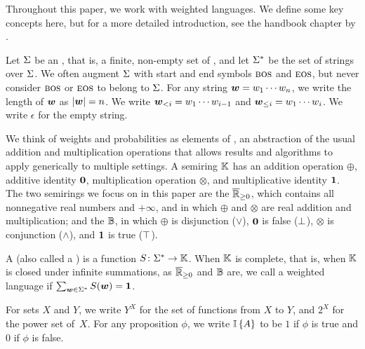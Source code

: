 \documentclass[acmsmall,screen,review,anonymous,nonacm]{PLDI/acmart}
\begin{document}
Throughout this paper, we work with weighted languages. We define some key concepts here, but for a more detailed introduction, see the handbook chapter by \citet{droste-kuich-2009}.

Let ${{ \Sigma}}$ be an , that is, a finite, non-empty set of , and let ${{{{ \Sigma}}^*}}$ 
be the set of strings over ${{ \Sigma}}$.
We often augment ${{ \Sigma}}$ with start and end symbols ${{\textsc{bos}}}$ and ${{\textsc{eos}}}$, but never consider ${{\textsc{bos}}}$ or ${{\textsc{eos}}}$ to belong to ${{ \Sigma}}$. 
For any string ${{\boldsymbol{w}}}=w_1\cdots w_n$, we write the length of ${{\boldsymbol{w}}}$ as $|{{\boldsymbol{w}}}|=n$. We write ${{\boldsymbol{w}}}_{<i} = w_1 \cdots w_{i-1}$ and ${{\boldsymbol{w}}}_{\le i} = w_1 \cdots w_i$. We write $\epsilon$ for the empty string.

We think of weights and probabilities as elements of , an abstraction of the usual addition and multiplication operations that allows results and algorithms to apply generically to multiple settings.
A semiring ${{ \mathbb{K}}}$ has an addition operation $\oplus$, additive identity ${{\mathbf{0}}}$, multiplication operation $\otimes$, and multiplicative identity ${{\mathbf{1}}}$. The two semirings we focus on in this paper are the  ${\overline{\mathbb{R}}_{\ge0}}$, which contains all nonnegative real numbers and $+\infty$, and in which $\oplus$ and $\otimes$ are real addition and multiplication; and the  ${{ \mathbb{B}}}$, in which $\oplus$ is disjunction ($\lor$), ${{\mathbf{0}}}$ is false (${\bot}$), $\otimes$ is conjunction ($\land$), and ${{\mathbf{1}}}$ is true (${\top}$).

A  (also called a ) is a function ${S} \colon {{{{ \Sigma}}^*}} \rightarrow {{ \mathbb{K}}}$.
When ${{ \mathbb{K}}}$ is complete, that is, when ${{ \mathbb{K}}}$ is closed under infinite summations, as ${\overline{\mathbb{R}}_{\ge0}}$ and ${{ \mathbb{B}}}$ are, we call a weighted language  if
$\sum_{{{\boldsymbol{w}}} \in {{{{ \Sigma}}^*}}} {S}({{\boldsymbol{w}}}) = {{\mathbf{1}}}$.

For sets $X$ and $Y$, we write $Y^X$ for the set of functions from $X$ to $Y$, and $2^X$ for %
the power set of~$X$. For any proposition $\phi$, we write $\mathbb{I} \left\{ {A} \right\}$ to be $1$ if $\phi$ is true and $0$ if $\phi$ is false.

\end{document}
